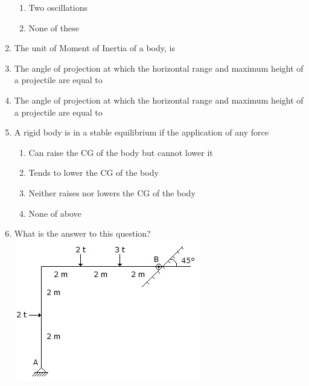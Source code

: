 \documentclass[11pt,a4paper]{article}
\begin{document}
\begin{enumerate}
\begin{enumerate}[label=\Alph*.]
\item{Two oscillations}
\item{None of these}
\end{enumerate}
\item{The unit of Moment of Inertia of a body, is}
\\
\item{The angle of projection at which the horizontal range and maximum height of a projectile are equal to}
\\
\item{The angle of projection at which the horizontal range and maximum height of a projectile are equal to}
\\
\item{A rigid body is in a stable equilibrium if the application of any force}
\begin{enumerate}[label=\Alph*.]
\item{Can raise the CG of the body but cannot lower it}
\item{Tends to lower the CG of the body}
\item{Neither raises nor lowers the CG of the body}
\item{None of above}
\end{enumerate}
\item{What is the answer to this question? \\
 \includegraphics{../data_img/applied-mechanics-and-graphic-statics_1525414812-5.png}
}
\end{enumerate}
\end{document}
